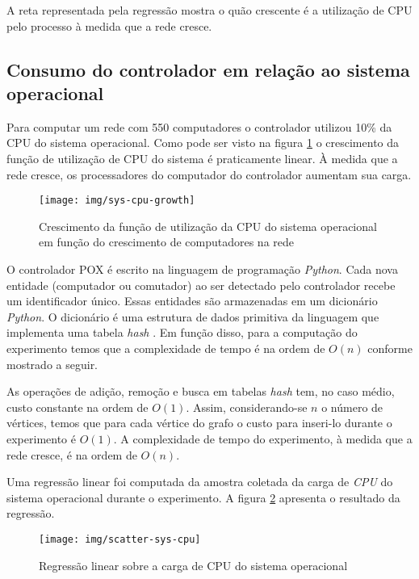 A reta representada pela regressão mostra o quão crescente é a utilização de
CPU pelo processo à medida que a rede cresce.


\subsection{Consumo do controlador em relação ao sistema operacional}

Para computar um rede com 550 computadores o controlador utilizou 10\% da
CPU do sistema operacional.
Como pode ser visto na figura \ref{fig:sys-cpu-growth} o crescimento da
função de utilização de CPU do sistema é praticamente linear.
À medida que a rede cresce, os processadores do computador do controlador
aumentam sua carga.

\begin{figure}[!htb]
    \centering
    \label{fig:sys-cpu-growth}
    \texttt{[image: img/sys-cpu-growth]}
    \caption{Crescimento da função de utilização da CPU do sistema operacional
    em função do crescimento de computadores na rede}
\end{figure}

O controlador POX é escrito na linguagem de programação \emph{Python}.
Cada nova entidade (computador ou comutador) ao ser detectado pelo controlador
recebe um identificador único.
Essas entidades são armazenadas em um dicionário \emph{Python}.
O dicionário é uma estrutura de dados primitiva da linguagem que implementa
uma tabela \emph{hash} \citep{maurer1975hash}.
Em função disso, para a computação do experimento temos que a complexidade
de tempo é na ordem de $O(n)$ conforme mostrado a seguir.

As operações de adição, remoção e busca em tabelas \emph{hash} tem, no
caso médio, custo constante na ordem de $O(1)$.
Assim, considerando-se $n$ o número de vértices, temos que para cada
vértice do grafo o custo para inseri-lo durante o experimento é $O(1)$.
A complexidade de tempo do experimento, à medida que a rede cresce, é na
ordem de $O(n)$.

Uma regressão linear foi computada da amostra coletada da carga de \emph{CPU}
do sistema operacional durante o experimento.
A figura \ref{fig:scatter-sys-cpu} apresenta o resultado da regressão.

\begin{figure}[!htb]
    \centering
    \label{fig:scatter-sys-cpu}
    \texttt{[image: img/scatter-sys-cpu]}
    \caption{Regressão linear sobre a carga de CPU do sistema operacional}
\end{figure}


